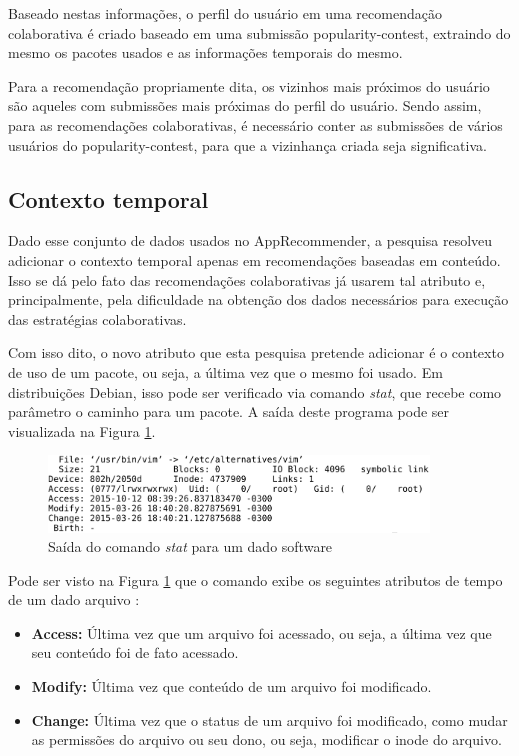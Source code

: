 Baseado nestas informações, o perfil do usuário em uma recomendação colaborativa
é criado baseado em uma submissão popularity-contest, extraindo do mesmo os pacotes usados e
as informações temporais do mesmo.

Para a recomendação propriamente dita, os vizinhos mais próximos do usuário são
aqueles com submissões mais próximas do perfil do usuário. Sendo assim, para as
recomendações colaborativas, é necessário conter as submissões de vários
usuários do popularity-contest, para que a vizinhança criada seja significativa.

\subsection{Contexto temporal} \label{sec:contexto_temporal}

Dado esse conjunto de dados usados no AppRecommender, a pesquisa resolveu
adicionar o contexto temporal apenas em recomendações baseadas em conteúdo. Isso
se dá pelo fato das recomendações colaborativas já usarem tal atributo e,
principalmente, pela dificuldade na obtenção dos dados necessários para execução
das estratégias colaborativas.

Com isso dito, o novo atributo que esta pesquisa pretende
adicionar é o contexto de uso de um pacote, ou seja, a última vez que o
mesmo foi usado. Em distribuições Debian, isso pode ser verificado via comando
\textit{stat}, que recebe como parâmetro o caminho para um pacote.
A saída deste programa pode ser visualizada na Figura \ref{fig:comando_stat}.

\begin{figure}[h]
  \centering
  \includegraphics[width=0.9\textwidth]{figuras/comando_stat.eps}
  \caption{Saída do comando \textit{stat} para um dado software}
  \label{fig:comando_stat}
\end{figure}

Pode ser visto na Figura \ref{fig:comando_stat} que o comando exibe os seguintes
atributos de tempo de um dado arquivo \cite{1_haas}:

\begin{itemize}
    \item \textbf{Access:} Última vez que um arquivo foi acessado, ou seja, a
        última vez que seu conteúdo foi de fato acessado.
    \item \textbf{Modify:} Última vez que conteúdo de um arquivo foi modificado.
    \item \textbf{Change:} Última vez que o status de um arquivo foi modificado,
        como mudar as permissões do arquivo ou seu dono, ou seja, modificar o
        inode do arquivo.
\end{itemize}

